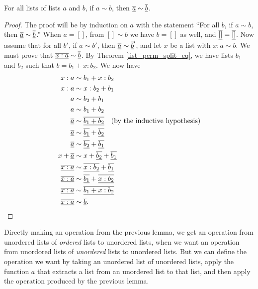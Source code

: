 \documentclass[../../math.tex]{subfiles}
\begin{document}
\begin{lemma}
    For all lists of lists $a$ and $b$, if $a \sim b$, then $\underline{\overline{a}} \sim
    \underline{\overline{b}}$.
\end{lemma}
\begin{proof}
    The proof will be by induction on $a$ with the statement ``For all $b$, if
    $a \sim b$, then $\underline{\overline{a}} \sim \underline{\overline{b}}$.''  When $a = []$, from $[]
    \sim b$ we have $b = []$ as well, and $\underline{\overline{[]}} = \underline{\overline{[]}}$.  Now
    assume that for all $b'$, if $a \sim b'$, then $\underline{\overline{a}} \sim \underline{\overline{b}}'$, and let $x$ be a list with $x : a \sim b$.  We must prove that
    $\underline{\overline{x : a}} \sim \underline{\overline{b}}$.  By Theorem \ref{list_perm_split_eq}, we
    have lists $b_1$ and $b_2$ such that $b = b_1 + x : b_2$.  We now have
    \begin{align*}
        x : a &\sim b_1 + x : b_2 \\
        x : a &\sim x : b_2 + b_1 \\
        a &\sim b_2 + b_1 \\
        a &\sim b_1 + b_2 \\
        \underline{\overline{a}} &\sim \underline{\overline{b_1 + b_2}} \text{\quad (by the inductive
            hypothesis)} \\
        \underline{\overline{a}} &\sim \underline{\overline{b_1}} + \underline{\overline{b_2}} \\
        \underline{\overline{a}} &\sim \underline{\overline{b_2}} + \underline{\overline{b_1}} \\
        x + \underline{\overline{a}} &\sim x + \underline{\overline{b_2}} + \underline{\overline{b_1}} \\
        \underline{\overline{x : a}} &\sim \underline{\overline{x : b_2}} + \underline{\overline{b_1}} \\
        \underline{\overline{x : a}} &\sim \underline{\overline{b_1}} + \underline{\overline{x : b_2}} \\
        \underline{\overline{x : a}} &\sim \underline{\overline{b_1 + x : b_2}} \\
        \underline{\overline{x : a}} &\sim \underline{\overline{b}}.
    \end{align*}
\end{proof}

Directly making an operation from the previous lemma, we get an operation from
unordered lists of \textit{ordered} lists to unordered lists, when we want an
operation from unordored lists of \textit{unordered} lists to unordered lists.
But we can define the operation we want by taking an unordered list of unordered
lists, apply the function ${a}$ that extracts a list from an unordered list to
that list, and then apply the operation produced by the previous lemma.
\end{document}
